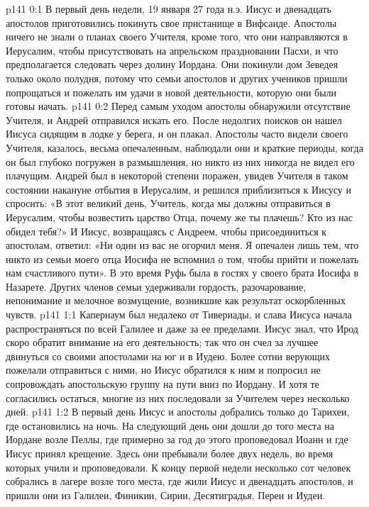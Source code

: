 \author{Комиссия срединников}
\vs p141 0:1 В первый день недели, 19 января 27 года н.э. Иисус и двенадцать апостолов приготовились покинуть свое пристанище в Вифсаиде. Апостолы ничего не знали о планах своего Учителя, кроме того, что они направляются в Иерусалим, чтобы присутствовать на апрельском праздновании Пасхи, и что предполагается следовать через долину Иордана. Они покинули дом Зеведея только около полудня, потому что семьи апостолов и других учеников пришли попрощаться и пожелать им удачи в новой деятельности, которую они были готовы начать.
\vs p141 0:2 Перед самым уходом апостолы обнаружили отсутствие Учителя, и Андрей отправился искать его. После недолгих поисков он нашел Иисуса сидящим в лодке у берега, и он плакал. Апостолы часто видели своего Учителя, казалось, весьма опечаленным, наблюдали они и краткие периоды, когда он был глубоко погружен в размышления, но никто из них никогда не видел его плачущим. Андрей был в некоторой степени поражен, увидев Учителя в таком состоянии накануне отбытия в Иерусалим, и решился приблизиться к Иисусу и спросить: «В этот великий день, Учитель, когда мы должны отправиться в Иерусалим, чтобы возвестить царство Отца, почему же ты плачешь? Кто из нас обидел тебя?» И Иисус, возвращаясь с Андреем, чтобы присоединиться к апостолам, ответил: «Ни один из вас не огорчил меня. Я опечален лишь тем, что никто из семьи моего отца Иосифа не вспомнил о том, чтобы прийти и пожелать нам счастливого пути». В это время Руфь была в гостях у своего брата Иосифа в Назарете. Других членов семьи удерживали гордость, разочарование, непонимание и мелочное возмущение, возникшие как результат оскорбленных чувств.
\vs p141 1:1 Капернаум был недалеко от Тивериады, и слава Иисуса начала распространяться по всей Галилее и даже за ее пределами. Иисус знал, что Ирод скоро обратит внимание на его деятельность; так что он счел за лучшее двинуться со своими апостолами на юг и в Иудею. Более сотни верующих пожелали отправиться с ними, но Иисус обратился к ним и попросил не сопровождать апостольскую группу на пути вниз по Иордану. И хотя те согласились остаться, многие из них последовали за Учителем через несколько дней.
\vs p141 1:2 В первый день Иисус и апостолы добрались только до Тарихеи, где остановились на ночь. На следующий день они дошли до того места на Иордане возле Пеллы, где примерно за год до этого проповедовал Иоанн и где Иисус принял крещение. Здесь они пребывали более двух недель, во время которых учили и проповедовали. К концу первой недели несколько сот человек собрались в лагере возле того места, где жили Иисус и двенадцать апостолов, и пришли они из Галилеи, Финикии, Сирии, Десятиградья, Переи и Иудеи.
